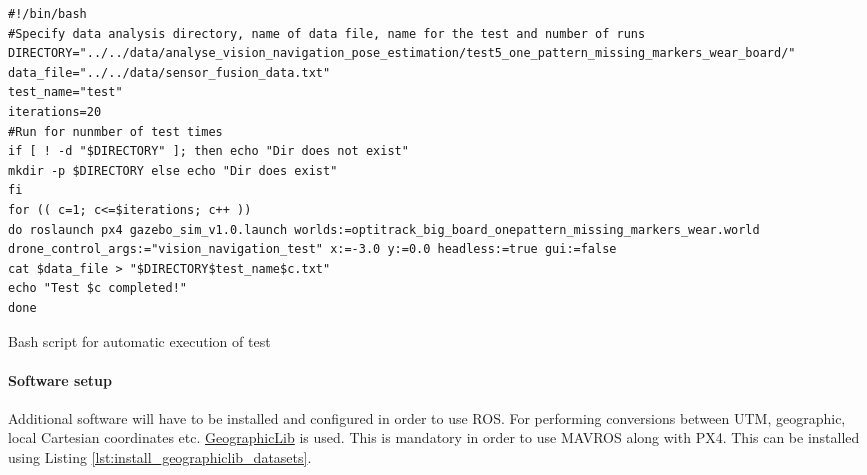 \documentclass[../Head/report.tex]{subfiles}
\begin{document}
\begin{listing}[H] 
\begin{tcolorbox}[
    enhanced,
    attach boxed title to top left={xshift=6mm,yshift=-3mm},
    colback=lightgreen!20,
    colframe=lightgreen,
    fonttitle=\bfseries\color{black},
]
\begin{verbatim}
#!/bin/bash
#Specify data analysis directory, name of data file, name for the test and number of runs
DIRECTORY="../../data/analyse_vision_navigation_pose_estimation/test5_one_pattern_missing_markers_wear_board/"
data_file="../../data/sensor_fusion_data.txt"
test_name="test"
iterations=20
#Run for nunmber of test times 
if [ ! -d "$DIRECTORY" ]; then echo "Dir does not exist" 
mkdir -p $DIRECTORY else echo "Dir does exist"
fi
for (( c=1; c<=$iterations; c++ ))
do roslaunch px4 gazebo_sim_v1.0.launch worlds:=optitrack_big_board_onepattern_missing_markers_wear.world drone_control_args:="vision_navigation_test" x:=-3.0 y:=0.0 headless:=true gui:=false 
cat $data_file > "$DIRECTORY$test_name$c.txt" 
echo "Test $c completed!"
done

\end{verbatim}
\end{tcolorbox}
\caption{Bash script for automatic execution of test}
\label{lst:bash_script_for_automatic_execution_of_test}    
\end{listing}   

\paragraph{Software setup} 

Additional software will have to be installed and configured in order to use ROS. For performing conversions between UTM, geographic, local Cartesian coordinates etc.  \href{https://geographiclib.sourceforge.io/}{GeographicLib} is used. This is mandatory in order to use MAVROS along with PX4. This can be installed using Listing \ref{lst:install_geographiclib_datasets}.
\end{document}
